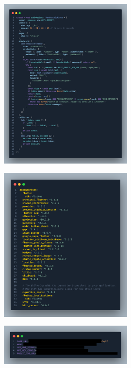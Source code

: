 \label{apendix:guardar-token-web}
\begin{figure}[H]
    \centering
    \includegraphics[width=0.6\textwidth]{chapters/appendices/code/guardar-token-web.png}
\end{figure}


\label{apendix:dependencias-movil}
\begin{figure}[H]
    \centering
    \includegraphics[width=0.6\textwidth]{chapters/appendices/code/dependencias-movil.png}
\end{figure}


\label{apendix:configuracion-env-movil}
\begin{figure}[H]
    \centering
    \includegraphics[width=0.6\textwidth]{chapters/appendices/code/configuracion-env-movil.png}
\end{figure}


